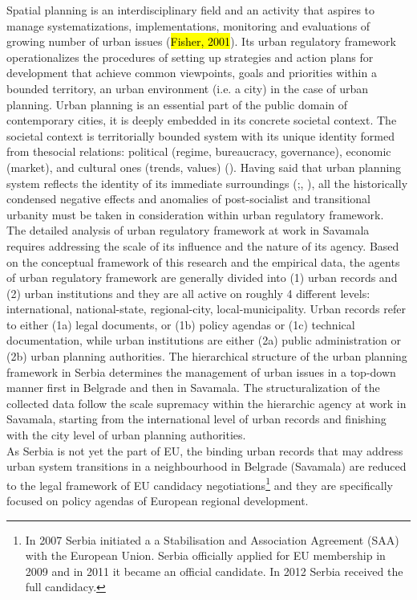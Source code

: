 \documentclass[11pt]{report}
\begin{document}
Spatial planning is an interdisciplinary field and an activity that aspires to manage systematizations, implementations, monitoring and evaluations of growing number of urban issues (\hl{Fisher, 2001}). Its urban regulatory framework operationalizes the procedures of setting up strategies and action plans for development that achieve common viewpoints, goals and priorities within a bounded territory, an urban environment (i.e. a city) in the case of urban planning.
Urban planning is an essential part of the public domain of contemporary cities, it is deeply embedded in its concrete societal context.
The societal context is territorially bounded system with its unique identity formed from thesocial relations:
political (regime, bureaucracy, governance),
economic (market), and
cultural ones (trends, values) (\cite{Vujosevic and Nedovic Budic 2006}).
Having said that urban planning system reflects the identity of its immediate surroundings (\cite{Stojkov and Dobricic 2012};, \cite{Arbter 2001}), all the historically condensed negative effects and anomalies of post-socialist and transitional urbanity must be taken in consideration within urban regulatory framework.
\\
The detailed analysis of urban regulatory framework at work in Savamala requires addressing the scale of its influence and the nature of its agency.
Based on the conceptual framework of this research and the empirical data, the agents of urban regulatory framework are generally divided into  (1) urban records and (2) urban institutions and they are all active on roughly 4 different levels: international, national-state, regional-city, local-municipality.
Urban records refer to either (1a) legal documents, or (1b) policy agendas or (1c) technical documentation, while urban institutions are either (2a) public administration or (2b) urban planning authorities.
The hierarchical structure of the urban planning framework in Serbia determines the management of urban issues in a top-down manner first in Belgrade and then in Savamala.
The structuralization of the collected data follow the scale supremacy within the hierarchic agency at work in Savamala, starting from the international level of urban records and finishing with the city level of urban planning authorities.
\\
As Serbia is not yet the part of EU, the binding urban records that may address urban system transitions in a neighbourhood in Belgrade (Savamala) are reduced to the legal framework of EU candidacy negotiations\footnote{In 2007 Serbia initiated a a Stabilisation and Association Agreement (SAA) with the European Union. Serbia officially applied for EU membership in 2009 and in 2011 it became an official candidate. In 2012 Serbia received the full candidacy.}
and they are specifically focused on policy agendas of European regional development.
\end{document}
